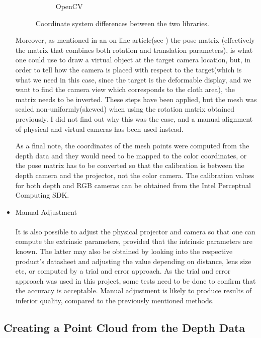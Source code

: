 \documentclass[]{article}
\begin{document}
\begin{itemize}
\begin{figure}[!hbtp]
\begin{subfigure}{.5\textwidth}
  \caption{OpenCV}
  \label{fig:OpenCVCoordinateSystem}
\end{subfigure}
\caption{Coordinate system differences between the two libraries.}
\label{fig:OpenCVOpenGLCoords}
\end{figure}

Moreover, as mentioned in an on-line article(see \cite{vuforia}) the pose matrix (effectively the matrix that combines both rotation and translation parameters), is what one could use to draw a virtual object at the target camera location, but, in order to tell how the camera is placed with respect to the target(which is what we need in this case, since the target is the deformable display, and we want to find the camera view which corresponds to the cloth area), the matrix needs to be inverted. These steps have been applied, but the mesh was scaled non-uniformly(skewed) when using the rotation matrix obtained previously. I did not find out why this was the case, and a manual alignment of physical and virtual cameras has been used instead. 

As a final note, the coordinates of the mesh points were computed from the depth data and they would need to be mapped to the color coordinates, or the pose matrix has to be converted so that the calibration is between the depth camera and the projector, not the color camera. The calibration values for both depth and RGB cameras can be obtained from the Intel Perceptual Computing SDK.

\item Manual Adjustment\\
\\It is also possible to adjust the physical projector and camera so that one can compute the extrinsic parameters, provided that the intrinsic parameters are known. The latter may also be obtained by looking into the respective product's datasheet and adjusting the value depending on distance, lens size etc, or computed by a trial and error approach. As the trial and error approach was used in this project, some tests need to be done to confirm that the accuracy is acceptable. Manual adjustment is likely to produce results of inferior quality, compared to the previously mentioned methods.
\end{itemize}

\subsection{Creating a Point Cloud from the Depth Data}
\end{document}
